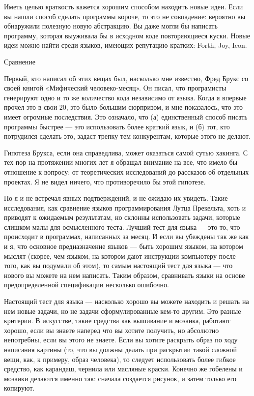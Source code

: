 \documentclass[ebook,12pt,oneside,openany]{memoir}
\begin{document}
Иметь целью краткость кажется хорошим способом находить новые идеи.
Если вы нашли способ сделать программы короче, то это не совпадение:
вероятно вы обнаружили полезную новую абстракцию. Вы даже могли бы
написать программу, которая выуживала бы в исходном коде повторяющиеся
куски. Новые идеи можно найти среди языков, имеющих репутацию кратких:
Forth, Joy, Icon.

Сравнение

Первый, кто написал об этих вещах был, насколько мне известно, Фред
Брукс со своей книгой «Мифический человеко-месяц». Он писал, что
програмисты генерируют одно и то же количество кода независимо от
языка. Когда я впервые прочел это в свои 20, это было большим
сюрпризом, и мне показалось, что это имеет огромные последствия. Это
означало, что (а) единственный способ писать программы быстрее — это
использовать более краткий язык, и (б) тот, кто потрудился сделать
это, задаст трепку тем конкурентам, которые этого не делают.

Гипотеза Брукса, если она справедлива, может оказаться самой сутью
хакинга. С тех пор на протяжении многих лет я обращал внимание на все,
что имело бы отношение к вопросу: от теоретических исследований до
рассказов об отдельных проектах. Я не видел ничего, что противоречило
бы этой гипотезе.

Но я и не встречал явных подтверждений, и не ожидаю их увидеть. Такие
исследования, как сравнение языков программирования Лутца Прекельта,
хоть и приводят к ожидаемым результатам, но склонны использовать
задачи, которые слишком малы для осмысленного теста. Лучший тест для
языка — это то, что происходит в программах, написанных за месяц. И
если вы убеждены так же как и я, что основное предназначение языков —
быть хорошим языком, на котором мыслят (скорее, чем языком, на котором
дают инструкции компьютеру после того, как вы подумали об этом), то
самым настоящий тест для языка — что нового вы можете на нем написать.
Таким образом, сравнивать языки на основе предопределенной
спецификации несколько ошибочно.

Настоящий тест для языка — насколько хорошо вы можете находить и
решать на нем новые задачи, но не задачи сформулированные кем-то
другим. Это разные критерии. В искусстве, такие средства как вышивание
и мозаика, работают хорошо, если вы знаете наперед что вы хотите
получить, но абсолютно непотребны, если вы этого не знаете. Если вы
хотите раскрыть образ по ходу написания картины (то, что вы должны
делать при раскрытии такой сложной вещи, как, к примеру, образ
человека), то следует использовать более гибкое средство, как
карандаш, чернила или масляные краски. Конечно же гобелены и мозаики
делаются именно так: сначала создается рисунок, и затем только его
копируют.
\end{document}
